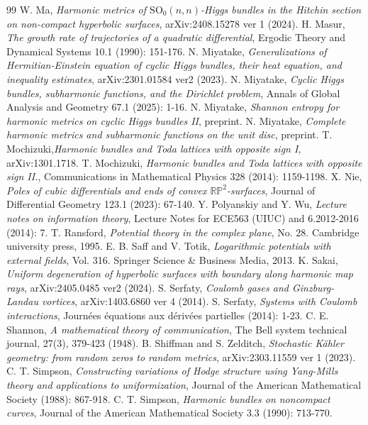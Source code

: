 \documentclass[12pt]{article}
\theoremstyle{definition}
\begin{document}
\begin{thebibliography}{99}
 W. Ma, {\it Harmonic metrics of $\mathrm {SO} _ {0}(n, n) $-Higgs bundles in the Hitchin section on non-compact hyperbolic surfaces}, arXiv:2408.15278 ver 1 (2024).
 H. Masur, {\it The growth rate of trajectories of a quadratic differential}, Ergodic Theory and Dynamical Systems 10.1 (1990): 151-176.
 N. Miyatake, {\it Generalizations of Hermitian-Einstein equation of cyclic Higgs bundles, their heat equation, and inequality estimates}, arXiv:2301.01584 ver2 (2023).
 N. Miyatake, {\it Cyclic Higgs bundles, subharmonic functions, and the Dirichlet problem}, Annals of Global Analysis and Geometry 67.1 (2025): 1-16.
 N. Miyatake, {\it Shannon entropy for harmonic metrics on cyclic Higgs bundles II}, preprint.
 N. Miyatake, {\it Complete harmonic metrics and subharmonic functions on the unit disc}, preprint. 
 T. Mochizuki,{\it Harmonic bundles and Toda lattices with opposite sign I}, arXiv:1301.1718.
 T. Mochizuki, {\it Harmonic bundles and Toda lattices with opposite sign II.}, Communications in Mathematical Physics 328 (2014): 1159-1198.
 X. Nie, {\it Poles of cubic differentials and ends of convex $\mathbb {RP}^ 2$-surfaces}, Journal of Differential Geometry 123.1 (2023): 67-140.
 Y. Polyanskiy and Y. Wu, {\it Lecture notes on information theory}, Lecture Notes for ECE563 (UIUC) and 6.2012-2016 (2014): 7.
 T. Ransford, {\it Potential theory in the complex plane}, No. 28. Cambridge university press, 1995.
 E. B. Saff and V. Totik, {\it Logarithmic potentials with external fields}, Vol. 316. Springer Science \& Business Media, 2013.
 K. Sakai, {\it Uniform degeneration of hyperbolic surfaces with boundary along harmonic map rays}, arXiv:2405.0485 ver2 (2024).
 S. Serfaty, {\it Coulomb gases and Ginzburg-Landau vortices}, arXiv:1403.6860 ver 4 (2014).
 S. Serfaty, {\it Systems with Coulomb interactions}, Journ\'ees \'equations aux d\'eriv\'ees partielles (2014): 1-23.
 C. E. Shannon, {\it A mathematical theory of communication}, The Bell system technical journal, 27(3), 379-423 (1948).
 B. Shiffman and S. Zelditch, {\it Stochastic K\" ahler geometry: from random zeros to random metrics}, arXiv:2303.11559 ver 1 (2023).
 C. T. Simpson, {\it Constructing variations of Hodge structure using Yang-Mills theory and applications to uniformization}, Journal of the American Mathematical Society (1988): 867-918.
 C. T. Simpson, {\it Harmonic bundles on noncompact curves}, Journal of the American Mathematical Society 3.3 (1990): 713-770.

\end{thebibliography}
\end{document}
